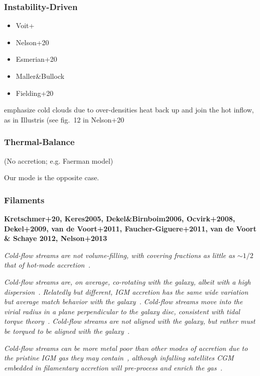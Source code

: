 \documentclass[fleqn,usenatbib]{mnras}
\begin{document}
\subsubsection{Instability-Driven}

\begin{itemize}
\item Voit+
\item  Nelson+20
\item  Esmerian+20
\item  Maller\&Bullock
\item Fielding+20
\end{itemize}
emphasize cold clouds due to over-densities heat back up and join the hot inflow, as in Illustris (see fig.~12 in Nelson+20

\subsubsection{Thermal-Balance}

(No accretion; e.g. Faerman model)

Our mode is the opposite case.

\subsubsection{Filaments}

\textbf{
Kretschmer+20,
Keres2005,
Dekel\&Birnboim2006,
Ocvirk+2008,
Dekel+2009,
van de Voort+2011,
Faucher-Giguere+2011,
van de Voort \& Schaye 2012,
Nelson+2013
}

\textit{
Cold-flow streams are not volume-filling, with covering fractions as little as $\sim 1/2$ that of hot-mode accretion~\citep[e.g.][]{Wright2021}.
}

\textit{
Cold-flow streams are, on average, co-rotating with the galaxy, albeit with a high dispersion~\citep[e.g.][]{Stewart2011a, danovich2012, Stewart2013, Stewart2017}.
Relatedly but different, IGM accretion has the same wide variation but average match behavior with the galaxy~\citep{Hafen2019}.
}
\textit{
Cold-flow streams move into the virial radius in a plane perpendicular to the galaxy disc, consistent with tidal torque theory~\citep{danovich2012}.
Cold-flow streams are not aligned with the galaxy, but rather must be torqued to be aligned with the galaxy~\cite{danovich2012, Danovich2015}.
}

\textit{
Cold-flow streams can be more metal poor than other modes of accretion due to the pristine IGM gas they may contain~\citep[e.g.][]{Wright2021}, although infalling satellites CGM embedded in filamentary accretion will pre-process and enrich the gas~\citep[e.g.][]{Hafen2019}.
}
\end{document}

